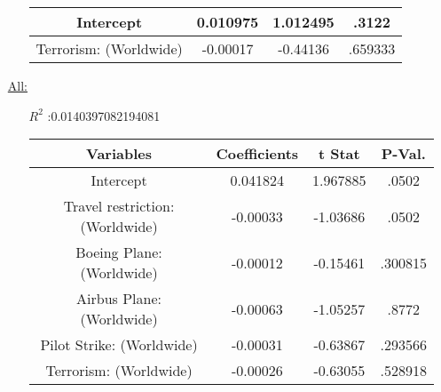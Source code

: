 \documentclass[12pt]{report}
\begin{document}
\begin{enumerate}
\begin{enumerate}
\begin{tabular}{|c|c|c|c|}
                    Intercept & 0.010975 & 1.012495 &.3122\\ \hline
                    Terrorism: (Worldwide) & -0.00017 & -0.44136&.659333 \\ \hline
                    \bottomrule
                \end{tabular}




        \end{enumerate}
    \item[\underline{All:}]
        \begin{enumerate}
            \item[$R^2$]:0.0140397082194081
            \item[]


                \begin{tabular}{|c|c|c|c|}
                    \toprule \hline
                    \textbf{Variables} & \textbf{Coefficients} & \textbf{t Stat}&\textbf{P-Val.} \\ \hline

                    Intercept & 0.041824 & 1.967885 &.0502 \\ \hline
                    Travel restriction: (Worldwide) & -0.00033 & -1.03686 &.0502 \\ \hline
                    Boeing Plane: (Worldwide) & -0.00012 & -0.15461 &.300815 \\ \hline
                    Airbus Plane: (Worldwide) & -0.00063 & -1.05257&.8772 \\ \hline
                    Pilot Strike: (Worldwide) & -0.00031 & -0.63867&.293566 \\ \hline
                    Terrorism: (Worldwide) & -0.00026 & -0.63055&.528918 \\ \hline
                    \bottomrule
                \end{tabular}



        \end{enumerate}
\end{enumerate}
\end{document}
